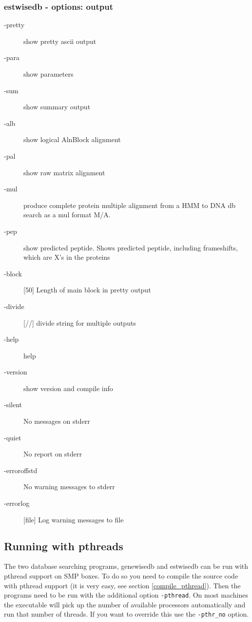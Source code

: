 \documentclass{article}
\begin{document}
\subsubsection{estwisedb - options: output}
\begin{description}
\item[-pretty]          show pretty ascii output
\item[-para]            show parameters
\item[-sum]             show summary output
\item[-alb]             show logical AlnBlock alignment
\item[-pal]             show raw matrix alignment
\item[-mul]             produce complete protein multiple alignment from a HMM to DNA db search as a mul format M/A.
\item[-pep]             show predicted peptide. Shows predicted peptide,
including frameshifts, which are X's in the proteins
\item[-block]  [50]     Length of main block in pretty output
\item[-divide] [//]     divide string for multiple outputs
\item[-help]      help
\item[-version]   show version and compile info
\item[-silent]    No messages on stderr
\item[-quiet]    No report on stderr
\item[-erroroffstd] No warning messages to stderr
\item[-errorlog] [file] Log warning messages to file
\end{description}

\subsection{Running with pthreads}
\label{running_pthread}

The two database searching programs, genewisedb and estwisedb can be run with pthread
support on SMP boxes. To do so you need to compile the source code with pthread
support (it is very easy, see section \ref{compile_pthread}). Then the programs
need to be run with the additional option {\tt -pthread}. On most machines the
executable will pick up the number of available processors automatically and 
run that number of threads. If you want to override this use the {\tt -pthr\_no} option.
\end{document}

